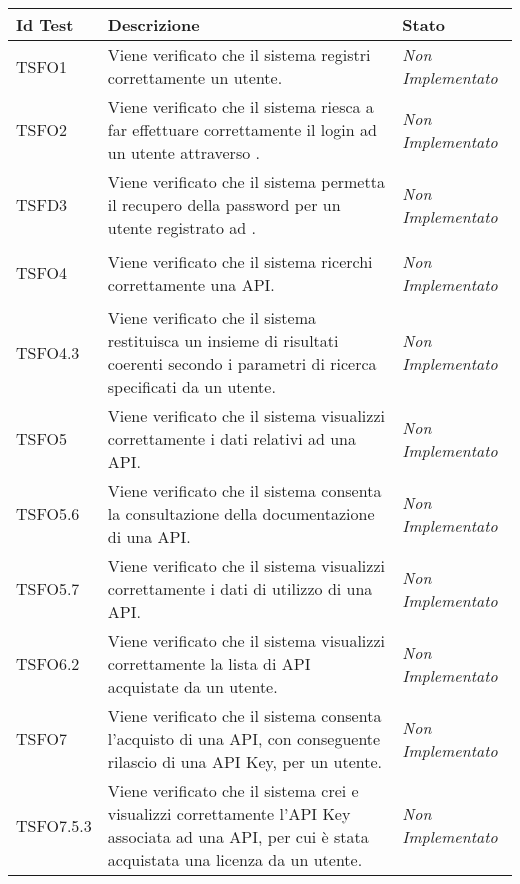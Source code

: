 	\normalsize
	\begin{longtable}{|>{\centering\arraybackslash}p{2.3cm}|>{\centering\arraybackslash}p{7.5cm} | >{\centering\arraybackslash}p{3.8cm}|}
		\hline \rowcolor{Gray}
		\textbf{Id Test} & \textbf{Descrizione} & \textbf{Stato}\\
		\hline
		\endhead
		\hypertarget{TSFO1}{TSFO1} & Viene verificato che il sistema registri correttamente un utente. & \textit{Non Implementato}\\ \hline
		\hypertarget{TSFO2}{TSFO2} & Viene verificato che il sistema riesca a far effettuare correttamente il login ad un utente attraverso \progetto. & \textit{Non Implementato}\\ \hline	
		\hypertarget{TSFD3}{TSFD3} & Viene verificato che il sistema permetta il recupero della password per un utente registrato ad \progetto. & \textit{Non Implementato}\\ \hline	
		\hypertarget{TSFO4}{TSFO4} & Viene verificato che il sistema ricerchi correttamente una API. & \textit{Non Implementato}\\ \hline
		\hypertarget{TSFO4.3}{TSFO4.3} & Viene verificato che il sistema restituisca un insieme di risultati coerenti secondo i parametri di ricerca specificati da un utente. & \textit{Non Implementato}\\ \hline	
		\hypertarget{TSFO5}{TSFO5} & Viene verificato che il sistema visualizzi correttamente i dati relativi ad una API. & \textit{Non Implementato}\\ \hline
		\hypertarget{TSFO5.6}{TSFO5.6} & Viene verificato che il sistema consenta la consultazione della documentazione di una API. & \textit{Non Implementato}\\ \hline
		\hypertarget{TSFO5.7}{TSFO5.7} & Viene verificato che il sistema visualizzi correttamente i dati di utilizzo di una API. & \textit{Non Implementato}\\ \hline
		\hypertarget{TSFO6.2}{TSFO6.2} & Viene verificato che il sistema visualizzi correttamente la lista di API acquistate da un utente. & \textit{Non Implementato}\\ \hline
		\hypertarget{TSFO7}{TSFO7} & Viene verificato che il sistema consenta l'acquisto di una API, con conseguente rilascio di una API Key, per un utente. & \textit{Non Implementato}\\ \hline
		\hypertarget{TSFO7.5.3}{TSFO7.5.3} & Viene verificato che il sistema crei e visualizzi correttamente l'API Key associata ad una API, per cui è stata acquistata una licenza da un utente. & \textit{Non Implementato}\\ \hline

\end{longtable}
